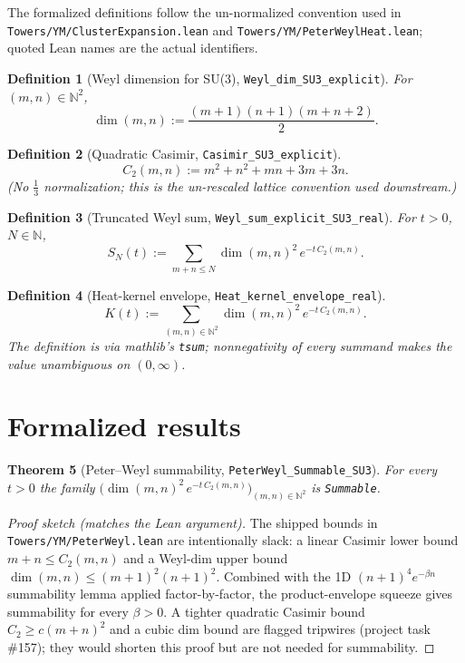\documentclass{article}
\newtheorem{theorem}{Theorem}[section]
\newtheorem{definition}[theorem]{Definition}
\begin{document}
The formalized definitions follow the un-normalized convention used
in \texttt{Towers/YM/ClusterExpansion.lean} and
\texttt{Towers/YM/PeterWeylHeat.lean}; quoted Lean names are the
actual identifiers.

\begin{definition}[Weyl dimension for SU(3), \texttt{Weyl\_dim\_SU3\_explicit}]
For $(m,n) \in \mathbb{N}^2$,
\[
  \dim(m,n) := \frac{(m+1)(n+1)(m+n+2)}{2}.
\]
\end{definition}

\begin{definition}[Quadratic Casimir, \texttt{Casimir\_SU3\_explicit}]
\[
  C_2(m,n) := m^2 + n^2 + mn + 3m + 3n.
\]
(No $\tfrac{1}{3}$ normalization; this is the un-rescaled lattice
convention used downstream.)
\end{definition}

\begin{definition}[Truncated Weyl sum, \texttt{Weyl\_sum\_explicit\_SU3\_real}]
For $t>0$, $N \in \mathbb{N}$,
\[
  S_N(t) := \sum_{m+n \le N} \dim(m,n)^2 \, e^{-t\,C_2(m,n)}.
\]
\end{definition}

\begin{definition}[Heat-kernel envelope, \texttt{Heat\_kernel\_envelope\_real}]
\[
  K(t) := \sum_{(m,n) \in \mathbb{N}^2} \dim(m,n)^2 \, e^{-t\,C_2(m,n)}.
\]
The definition is via mathlib's \texttt{tsum}; nonnegativity of every
summand makes the value unambiguous on $(0,\infty)$.
\end{definition}

\section{Formalized results}

\begin{theorem}[Peter--Weyl summability, \texttt{PeterWeyl\_Summable\_SU3}]
\label{thm:summable}
For every $t>0$ the family
$\bigl(\dim(m,n)^2\, e^{-t\,C_2(m,n)}\bigr)_{(m,n)\in\mathbb{N}^2}$
is \texttt{Summable}.
\end{theorem}

\begin{proof}[Proof sketch (matches the Lean argument)]
The shipped bounds in \texttt{Towers/YM/PeterWeyl.lean} are
intentionally slack: a linear Casimir lower bound
$m+n \le C_2(m,n)$ and a Weyl-dim upper bound
$\dim(m,n) \le (m+1)^2 (n+1)^2$. Combined with the 1D
$(n+1)^4 e^{-\beta n}$ summability lemma applied factor-by-factor,
the product-envelope squeeze gives summability for every
$\beta > 0$. A tighter quadratic Casimir bound $C_2 \ge c(m+n)^2$
and a cubic dim bound are flagged tripwires (project task
\#157); they would shorten this proof but are not needed for
summability.
\end{proof}
\end{document}
